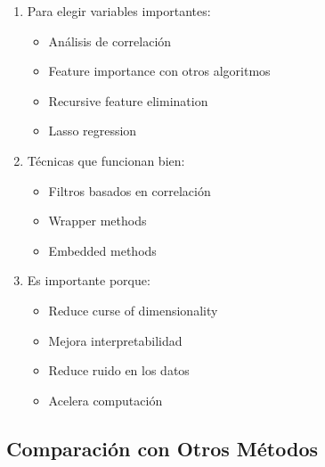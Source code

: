 \documentclass[12pt]{article}
\begin{document}
\begin{enumerate}
    \item Para elegir variables importantes:
    \begin{itemize}
        \item Análisis de correlación
        \item Feature importance con otros algoritmos
        \item Recursive feature elimination
        \item Lasso regression
    \end{itemize}
    \item Técnicas que funcionan bien:
    \begin{itemize}
        \item Filtros basados en correlación
        \item Wrapper methods
        \item Embedded methods
    \end{itemize}
    \item Es importante porque:
    \begin{itemize}
        \item Reduce curse of dimensionality
        \item Mejora interpretabilidad
        \item Reduce ruido en los datos
        \item Acelera computación
    \end{itemize}
\end{enumerate}


\subsection{Comparación con Otros Métodos}
\end{document}
